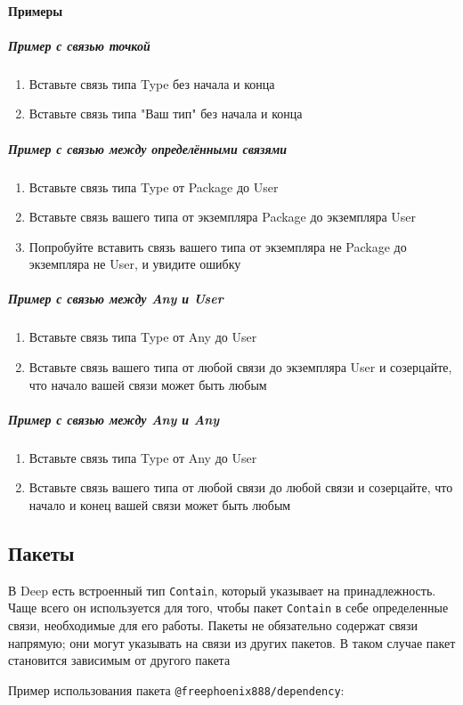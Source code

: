 \documentclass{article}
\begin{document}
\paragraph{Примеры}
\subparagraph{Пример с связью точкой}
\begin{enumerate}
  \item Вставьте связь типа Type без начала и конца
  \item Вставьте связь типа "Ваш тип" без начала и конца
\end{enumerate}
\subparagraph{Пример с связью между определёнными связями}
\begin{enumerate}
  \item Вставьте связь типа Type от Package до User
  \item Вставьте связь вашего типа от экземпляра Package до экземпляра User
  \item Попробуйте вставить связь вашего типа от экземпляра не Package до
        экземпляра не User, и увидите ошибку
\end{enumerate}
\subparagraph{Пример с связью между Any и User}
\begin{enumerate}
  \item Вставьте связь типа Type от Any до User
  \item Вставьте связь вашего типа от любой связи до экземпляра User и
        созерцайте, что начало вашей связи может быть любым
\end{enumerate}
\subparagraph{Пример с связью между Any и Any}
\begin{enumerate}
  \item Вставьте связь типа Type от Any до User
  \item Вставьте связь вашего типа от любой связи до любой связи и
        созерцайте, что начало и конец вашей связи может быть любым
\end{enumerate}
\subsection{Пакеты}

В Deep есть встроенный тип \texttt{Contain}, который указывает на
принадлежность. Чаще всего он используется для того, чтобы пакет
\texttt{Contain} в себе определенные связи, необходимые для его работы.
Пакеты не обязательно содержат связи напрямую; они могут
                указывать на связи из других пакетов. В таком случае пакет становится зависимым от другого пакета


Пример использования пакета \texttt{@freephoenix888/dependency}:
\end{document}
